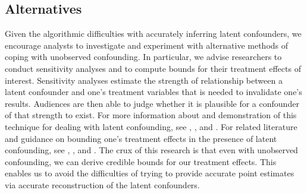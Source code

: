 \subsection{Alternatives}
\label{sec:deconfounder-alternatives}
Given the algorithmic difficulties with accurately inferring latent confounders,
we encourage analysts to investigate and experiment with alternative methods of
coping with unobserved confounding.
In particular, we advise researchers to conduct sensitivity analyses and to compute bounds for their treatment effects of interest.
Sensitivity analyses estimate the strength of relationship between a latent confounder and one's treatment variables that is needed to invalidate one's results.
Audiences are then able to judge whether it is plausible for a confounder of that strength to exist.
For more information about and demonstration of this technique for dealing with latent confounding,
see \citet{rosenbaum_1983_assessing}, \citet{liu_2013_introduction}, and \citet{jung_2020_bayesian}.
For related literature and guidance on bounding one's treatment effects in the presence of latent confounding,
see \citet{manski_1990_nonparametric}, \citet{richardson_2014_nonparametric}, and \citet{geiger_2014_estimating}.
The crux of this research is that even with unobserved confounding, we can derive credible bounds for our treatment effects.
This enables us to avoid the difficulties of trying to provide accurate point estimates via accurate reconstruction of the latent confounders.
